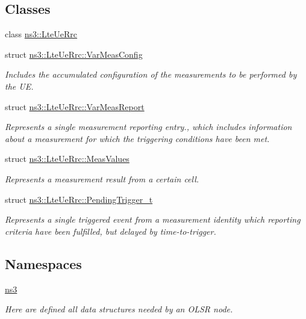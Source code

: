 \subsection*{Classes}
\begin{DoxyCompactItemize}
\item 
class \hyperlink{classns3_1_1LteUeRrc}{ns3\+::\+Lte\+Ue\+Rrc}
\item 
struct \hyperlink{structns3_1_1LteUeRrc_1_1VarMeasConfig}{ns3\+::\+Lte\+Ue\+Rrc\+::\+Var\+Meas\+Config}
\begin{DoxyCompactList}\small\item\em Includes the accumulated configuration of the measurements to be performed by the UE. \end{DoxyCompactList}\item 
struct \hyperlink{structns3_1_1LteUeRrc_1_1VarMeasReport}{ns3\+::\+Lte\+Ue\+Rrc\+::\+Var\+Meas\+Report}
\begin{DoxyCompactList}\small\item\em Represents a single measurement reporting entry., which includes information about a measurement for which the triggering conditions have been met. \end{DoxyCompactList}\item 
struct \hyperlink{structns3_1_1LteUeRrc_1_1MeasValues}{ns3\+::\+Lte\+Ue\+Rrc\+::\+Meas\+Values}
\begin{DoxyCompactList}\small\item\em Represents a measurement result from a certain cell. \end{DoxyCompactList}\item 
struct \hyperlink{structns3_1_1LteUeRrc_1_1PendingTrigger__t}{ns3\+::\+Lte\+Ue\+Rrc\+::\+Pending\+Trigger\+\_\+t}
\begin{DoxyCompactList}\small\item\em Represents a single triggered event from a measurement identity which reporting criteria have been fulfilled, but delayed by time-\/to-\/trigger. \end{DoxyCompactList}\end{DoxyCompactItemize}
\subsection*{Namespaces}
\begin{DoxyCompactItemize}
\item 
 \hyperlink{namespacens3}{ns3}
\begin{DoxyCompactList}\small\item\em Here are defined all data structures needed by an O\+L\+SR node. \end{DoxyCompactList}\end{DoxyCompactItemize}
